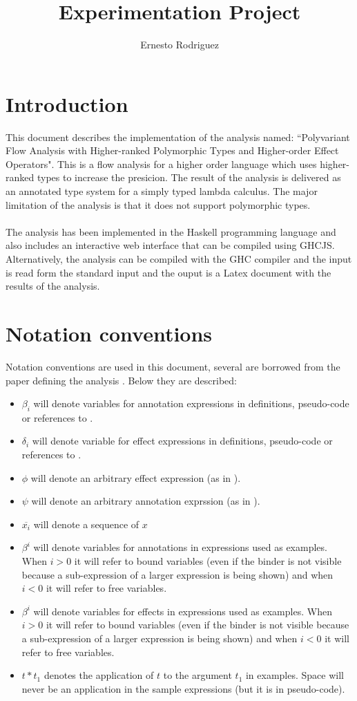 \documentclass[8pt]{extarticle}
\title{Experimentation Project}
\author{Ernesto Rodriguez}
\begin{document}
\maketitle
\section{Introduction}
This document describes the implementation of the analysis named: ``Polyvariant Flow Analysis with Higher-ranked Polymorphic Types and Higher-order Effect Operators". This is a flow analysis for a higher order language which uses higher-ranked types to increase the presicion. The result of the analysis is delivered as an annotated type system for a simply typed lambda calculus. The major limitation of the analysis is that it does not support polymorphic types.
\\\\
The analysis has been implemented in the Haskell programming language and also includes an interactive web interface that can be compiled using GHCJS\cite{GHCJS}. Alternatively, the analysis can be compiled with the GHC compiler and the input is read form the standard input and the ouput is a Latex document with the results of the analysis.
\section{Notation conventions}
Notation conventions are used in this document, several are borrowed from the paper defining the analysis \cite{analysis}. Below they are described:
\begin{itemize}
\item $\beta_i$ will denote variables for annotation expressions in definitions, pseudo-code or references to \cite{analysis}.
\item $\delta_i$ will denote variable for effect expressions in definitions, pseudo-code or references to \cite{analysis}.
\item $\phi$ will denote an arbitrary effect expression (as in \cite{analysis}).
\item $\psi$ will denote an arbitrary annotation exprssion (as in \cite{analysis}).
\item $\overline{x_i}$ will denote a sequence of $x$
\item $\beta^{i}$ will denote variables for annotations in expressions used as examples. When $i>0$ it will refer to bound variables (even if the binder is not visible because a sub-expression of a larger expression is being shown) and when $i<0$ it will refer to free variables.
\item $\beta^{i}$ will denote variables for effects in expressions used as examples. When $i>0$ it will refer to bound variables (even if the binder is not visible because a sub-expression of a larger expression is being shown) and when $i<0$ it will refer to free variables.
\item $t*t_1$ denotes the application of $t$ to the argument $t_1$ in examples. Space will never be an application in the sample expressions (but it is in pseudo-code).
\end{itemize}
\end{document}
